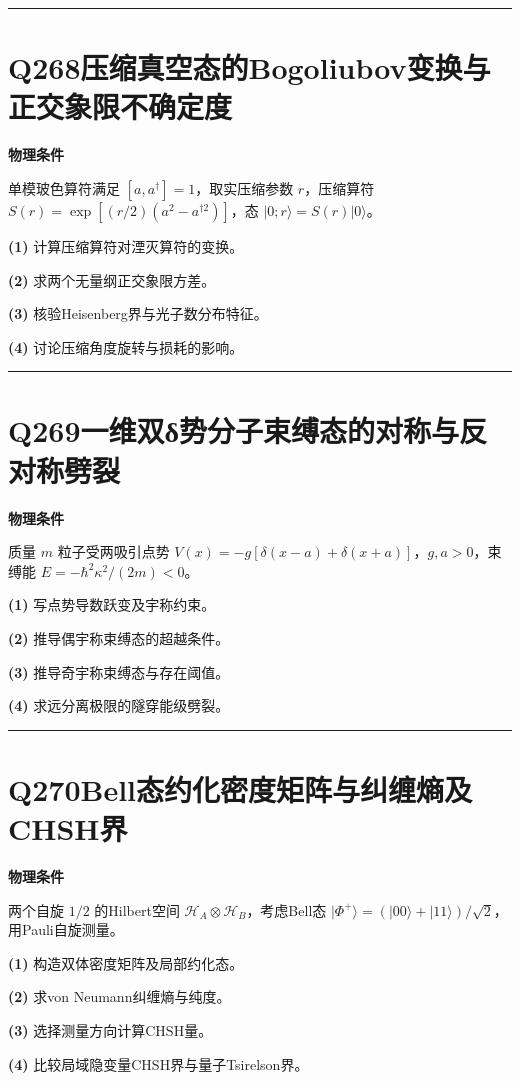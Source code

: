 \documentclass[UTF8,a4paper,11pt,oneside,openany]{ctexbook}
\begin{document}
\par\bigskip\hrule\bigskip
\section*{Q268\quad 压缩真空态的Bogoliubov变换与正交象限不确定度}
\textbf{物理条件}\par 单模玻色算符满足 \([a,a^\dagger]=1\)，取实压缩参数 \(r\)，压缩算符 \(S(r)=\exp[(r/2)(a^2-a^{\dagger2})]\)，态 \(|0;r\rangle=S(r)|0\rangle\)。
\par\noindent\textbf{(1)} 计算压缩算符对湮灭算符的变换。
\par\noindent\textbf{(2)} 求两个无量纲正交象限方差。
\par\noindent\textbf{(3)} 核验Heisenberg界与光子数分布特征。
\par\noindent\textbf{(4)} 讨论压缩角度旋转与损耗的影响。

\par\bigskip\hrule\bigskip
\section*{Q269\quad 一维双δ势分子束缚态的对称与反对称劈裂}
\textbf{物理条件}\par 质量 \(m\) 粒子受两吸引点势 \(V(x)=-g[\delta(x-a)+\delta(x+a)]\)，\(g,a>0\)，束缚能 \(E=-\hbar^2\kappa^2/(2m)<0\)。
\par\noindent\textbf{(1)} 写点势导数跃变及宇称约束。
\par\noindent\textbf{(2)} 推导偶宇称束缚态的超越条件。
\par\noindent\textbf{(3)} 推导奇宇称束缚态与存在阈值。
\par\noindent\textbf{(4)} 求远分离极限的隧穿能级劈裂。

\par\bigskip\hrule\bigskip
\section*{Q270\quad Bell态约化密度矩阵与纠缠熵及CHSH界}
\textbf{物理条件}\par 两个自旋 \(1/2\) 的Hilbert空间 \(\mathcal H_A\otimes\mathcal H_B\)，考虑Bell态 \(|\Phi^+\rangle=(|00\rangle+|11\rangle)/\sqrt2\)，用Pauli自旋测量。
\par\noindent\textbf{(1)} 构造双体密度矩阵及局部约化态。
\par\noindent\textbf{(2)} 求von Neumann纠缠熵与纯度。
\par\noindent\textbf{(3)} 选择测量方向计算CHSH量。
\par\noindent\textbf{(4)} 比较局域隐变量CHSH界与量子Tsirelson界。
\end{document}
